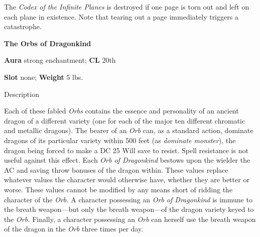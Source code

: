 The \textit{Codex of the Infinite Planes }is destroyed if one page is torn out and left on each plane in existence. Note that tearing out a page immediately triggers a catastrophe.
				
\textbf{The Orbs of Dragonkind}
				
\textbf{Aura} strong enchantment; \textbf{CL} 20th
				
\textbf{Slot} none; \textbf{Weight} 5 lbs.
				
Description
				
Each of these fabled \textit{Orbs} contains the essence and personality of an ancient dragon of a different variety (one for each of the major ten different chromatic and metallic dragons). The bearer of an \textit{Orb }can, as a standard action, dominate dragons of its particular variety within 500 feet (as \textit{dominate monster}), the dragon being forced to make a DC 25 Will save to resist. Spell resistance is not useful against this effect. Each \textit{Orb of Dragonkind }bestows upon the wielder the AC and saving throw bonuses of the dragon within. These values replace whatever values the character would otherwise have, whether they are better or worse. These values cannot be modified by any means short of ridding the character of the \textit{Orb. }A character possessing an \textit{Orb of Dragonkind }is immune to the breath weapon---but only the breath weapon---of the dragon variety keyed to the \textit{Orb. }Finally, a character possessing an \textit{Orb }can herself use the breath weapon of the dragon in the \textit{Orb }three times per day.
				
